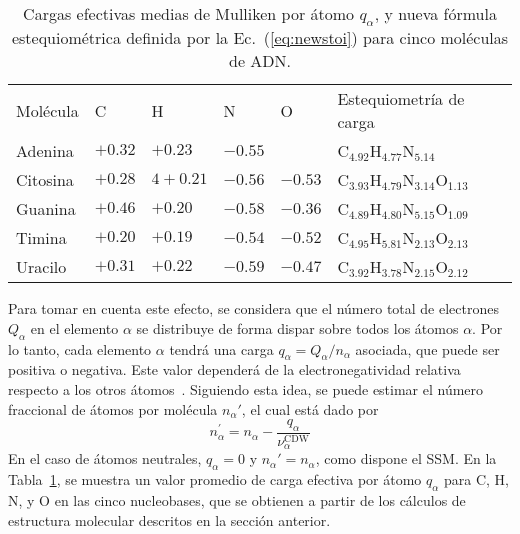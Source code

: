 \begin{table}
\begin{center}
\begin{tabularx}{\textwidth}{
>{\centering\arraybackslash}p{}
>{\centering\arraybackslash}p{}
>{\centering\arraybackslash}p{}
>{\centering\arraybackslash}p{}
>{\centering\arraybackslash}p{}
>{\centering\arraybackslash}p{}}
\rowcolor{mydarkgray} 
Molécula & C & H & N & O & Estequiometría de carga \\
Adenina & $+0.32$ & $+0.23$ & $-0.55$ &       & 
C$_{4.92}$H$_{4.77}$N$_{5.14}$ \\ 
\rowcolor{mygray} 
Citosina & $+0.28$ & $4+0.21$ & $-0.56$ & $-0.53$ & 
C$_{3.93}$H$_{4.79}$N$_{3.14}$O$_{1.13}$ \\ 
Guanina & $+0.46$ & $+0.20$ & $-0.58$ & $-0.36$ & 
C$_{4.89}$H$_{4.80}$N$_{5.15}$O$_{1.09}$ \\ 
\rowcolor{mygray} 
Timina & $+0.20$ & $+0.19$ & $-0.54$ & $-0.52$ & 
C$_{4.95}$H$_{5.81}$N$_{2.13}$O$_{2.13}$ \\ 
Uracilo & $+0.31$ & $+0.22$ & $-0.59$ & $-0.47$ & 
C$_{3.92}$H$_{3.78}$N$_{2.15}$O$_{2.12}$ \\ 
\end{tabularx}
\caption[Cargas efectivas medias de Mulliken por átomo]
{Cargas efectivas medias de Mulliken por átomo $q_{\alpha}$, y nueva 
fórmula estequiométrica definida por la Ec.~(\ref{eq:newstoi}) para 
cinco moléculas de ADN.}
\label{tab:newstoi}
\end{center}
\end{table}

Para tomar en cuenta este efecto, se considera que el número total 
de electrones $Q_{\alpha }$ en el elemento $\alpha$ se distribuye de 
forma dispar sobre todos los átomos $\alpha$. Por lo tanto, cada 
elemento $\alpha$ tendrá una carga $q_{\alpha}=Q_{\alpha}/n_{\alpha}$ 
asociada, que puede ser positiva o negativa. Este valor dependerá de la 
electronegatividad relativa respecto a los otros 
átomos~\cite{rappe1991}. 
Siguiendo esta idea, se puede estimar el número fraccional de átomos por 
molécula $n_{\alpha}'$, el cual está dado por 
\begin{equation}
n_{\alpha }^{\prime }=n_{\alpha }-
\frac{q_{\alpha }}{\nu_{\alpha }^{\text{CDW}}}
\label{eq:newstoi}
\end{equation}
En el caso de átomos neutrales, $q_{\alpha}=0$ y 
$n_{\alpha}'=n_{\alpha}$, como dispone el SSM. En la 
Tabla~\ref{tab:newstoi}, se muestra un valor promedio de carga efectiva 
por átomo $q_{\alpha}$ para C, H, N, y O en las cinco nucleobases, que 
se obtienen a partir de los cálculos de estructura molecular descritos 
en la sección anterior.

